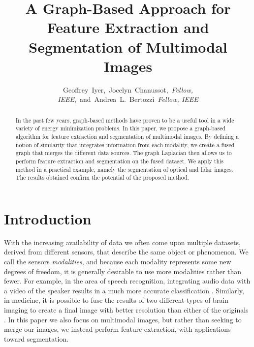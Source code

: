 \documentclass[journal]{IEEEtran}
\title{A Graph-Based Approach for Feature Extraction and Segmentation of Multimodal Images}
\author{Geoffrey~Iyer,~Jocelyn~Chanussot,~\emph{Fellow, IEEE},~and~Andrea~L.~Bertozzi~\emph{Fellow, IEEE}%
}
\begin{document}
% 
\maketitle
% 
\begin{abstract}
  In the past few years, graph-based methods have proven to be a useful tool in
  a wide variety of energy minimization problems.  In this paper, we propose a
  graph-based algorithm for feature extraction and segmentation of multimodal
  images. By defining a notion of similarity that integrates information from
  each modality, we create a fused graph that merges the different data sources.
  The graph Laplacian then allows us to perform feature extraction and
  segmentation on the fused dataset. We apply this method in a practical
  example, namely the segmentation of optical and lidar images. The results
  obtained confirm the potential of the proposed method.
\end{abstract}


\section{Introduction}
\label{sec:intro}

With the increasing availability of data we often come upon multiple datasets,
derived from different sensors, that describe the same object or phenomenon. We
call the sensors \emph{modalities}, and because each modality represents some
new degrees of freedom, it is generally desirable to use more modalities rather
than fewer. For example, in the area of speech recognition, integrating audio
data with a video of the speaker results in a much more accurate classification
\cite{Potamianos03, sedighin:hal-01400542}. Similarly, in medicine, it is
possible to fuse the results of two different types of brain imaging to create a
final image with better resolution than either of the originals
\cite{Lei12,Samadi2016} .  In this paper we also focus on multimodal images, but
rather than seeking to merge our images, we instead perform feature extraction,
with applications toward segmentation.
\end{document}
